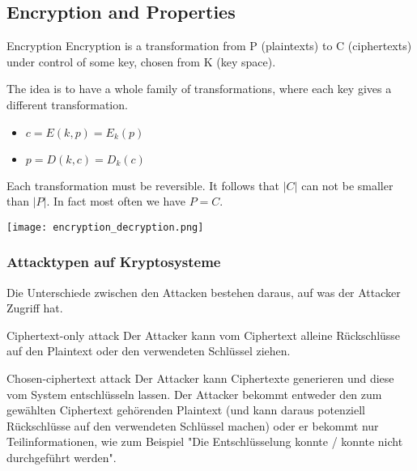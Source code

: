 \subsection{Encryption and Properties}

\begin{concept}{Encryption}
    Encryption is a transformation from P (plaintexts) to C (ciphertexts) under control of some key, chosen from K (key space).
    
    The idea is to have a whole family of transformations, where each key gives a different transformation.
    \begin{itemize}
        \item $c = E(k, p) = E_k(p)$
        \item $p = D(k, c) = D_k(c)$
    \end{itemize}
    
    Each transformation must be reversible. It follows that $|C|$ can not be smaller than $|P|$. In fact most often we have $P = C$.
\end{concept}

\texttt{[image: encryption\_decryption.png]}

\subsubsection{Attacktypen auf Kryptosysteme}

\begin{remark}
    Die Unterschiede zwischen den Attacken bestehen daraus, auf was der Attacker Zugriff hat.
\end{remark}

\begin{definition}{Ciphertext-only attack}
    Der Attacker kann vom Ciphertext alleine Rückschlüsse auf den Plaintext oder den 
    verwendeten Schlüssel ziehen.
\end{definition}

\begin{definition}{Chosen-ciphertext attack}
    Der Attacker kann Ciphertexte generieren und diese vom System entschlüsseln lassen. 
    Der Attacker bekommt entweder den zum gewählten Ciphertext gehörenden Plaintext 
    (und kann daraus potenziell Rückschlüsse auf den verwendeten Schlüssel machen) 
    oder er bekommt nur Teilinformationen, wie zum Beispiel 
    "Die Entschlüsselung konnte / konnte nicht durchgeführt werden".
\end{definition}

